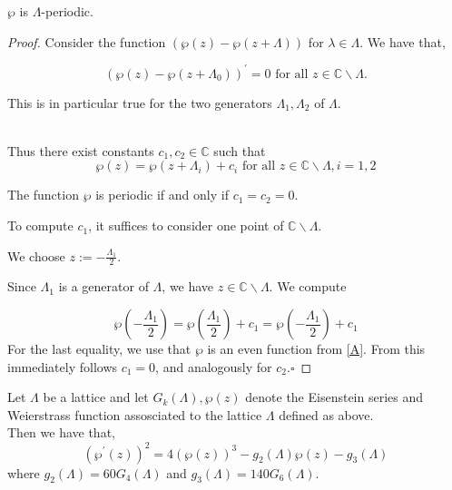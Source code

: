 \begin{corollary}
    $\wp$ is $\Lambda$-periodic.

    \begin{proof}
    Consider the function 
$\left(\wp(z)-\wp\left(z+\Lambda\right)\right)$ for $\lambda \in \Lambda$.
We have that,

$$
\left(\wp(z)-\wp\left(z+\Lambda_{0}\right)\right)^{\prime}=0 \text { for all } z \in \mathbb{C} \backslash \Lambda .
$$

This is in particular true for the two generators $\Lambda_{1}, \Lambda_{2}$ of $\Lambda$. 

\\
Thus there exist constants $c_{1}, c_{2} \in \mathbb{C}$ such that
$$
\wp(z)=\wp\left(z+\Lambda_{i}\right)+c_{i} \text { for all } z \in \mathbb{C} \backslash \Lambda, i=1,2
$$

The function $\wp$ is periodic if and only if $c_{1}=c_{2}=0$.

To compute $c_{1}$, it suffices to consider one point of $\mathbb{C} \backslash \Lambda$.

We choose $z:=-\frac{\Lambda_{1}}{2}$.

Since $\Lambda_{1}$ is a generator of $\Lambda$, we have $z \in \mathbb{C} \backslash \Lambda$. We compute

$$
\wp\left(-\frac{\Lambda_{1}}{2}\right)=\wp\left(\frac{\Lambda_{1}}{2}\right)+c_{1}=\wp\left(-\frac{\Lambda_{1}}{2}\right)+c_{1}
$$
For the last equality, we use that $\wp$ is an even function from \ref{A}.
From this immediately follows $c_{1}=0$, and analogously for $c_{2} . \square$
    \end{proof}
\end{corollary}

\begin{proposition}

Let $\Lambda$ be a lattice and let $G_k(\Lambda), \wp(z)$ denote the Eisenstein series and Weierstrass function assosciated to the lattice $\Lambda$ defined as above. \\ Then we have that, 
$$
\left(\wp^{\prime}(z)\right)^{2}=4(\wp(z))^{3}-g_{2}(\Lambda) \wp(z)-g_{3}(\Lambda)
$$
where $g_{2}(\Lambda)=60 G_{4}(\Lambda)$ and $g_{3}(\Lambda)=140 G_{6}(\Lambda)$.

\end{proposition}



